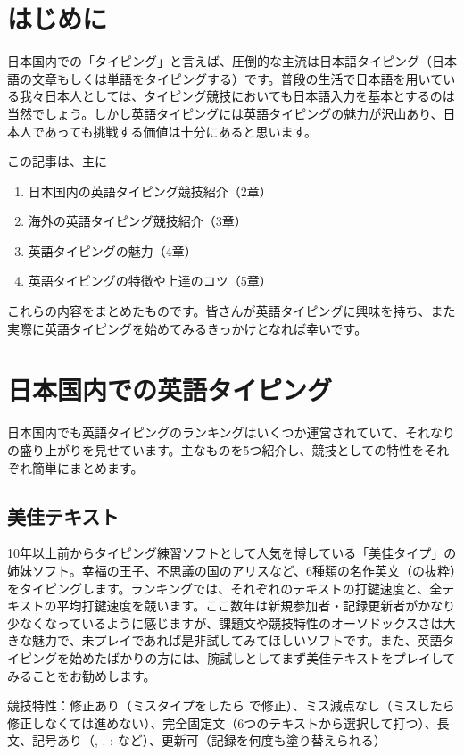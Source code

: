
\section{はじめに}

日本国内での「タイピング」と言えば、圧倒的な主流は日本語タイピング（日本語の文章もしくは単語をタイピングする）です。普段の生活で日本語を用いている我々日本人としては、タイピング競技においても日本語入力を基本とするのは当然でしょう。しかし英語タイピングには英語タイピングの魅力が沢山あり、日本人であっても挑戦する価値は十分にあると思います。

この記事は、主に
\begin{enumerate}
 \item 日本国内の英語タイピング競技紹介（2章）
 \item 海外の英語タイピング競技紹介（3章）
 \item 英語タイピングの魅力（4章）
 \item 英語タイピングの特徴や上達のコツ（5章）
\end{enumerate}
これらの内容をまとめたものです。皆さんが英語タイピングに興味を持ち、また実際に英語タイピングを始めてみるきっかけとなれば幸いです。

\section{日本国内での英語タイピング}

日本国内でも英語タイピングのランキングはいくつか運営されていて、それなりの盛り上がりを見せています。主なものを5つ紹介し、競技としての特性をそれぞれ簡単にまとめます。

\subsection{美佳テキスト}

10年以上前からタイピング練習ソフトとして人気を博している「美佳タイプ」の姉妹ソフト。幸福の王子、不思議の国のアリスなど、6種類の名作英文（の抜粋）をタイピングします。ランキングでは、それぞれのテキストの打鍵速度と、全テキストの平均打鍵速度を競います。ここ数年は新規参加者・記録更新者がかなり少なくなっているように感じますが、課題文や競技特性のオーソドックスさは大きな魅力で、未プレイであれば是非試してみてほしいソフトです。また、英語タイピングを始めたばかりの方には、腕試しとしてまず美佳テキストをプレイしてみることをお勧めします。

競技特性：修正あり（ミスタイプをしたら  で修正）、ミス減点なし（ミスしたら修正しなくては進めない）、完全固定文（6つのテキストから選択して打つ）、長文、記号あり（, . : など）、更新可（記録を何度も塗り替えられる）

